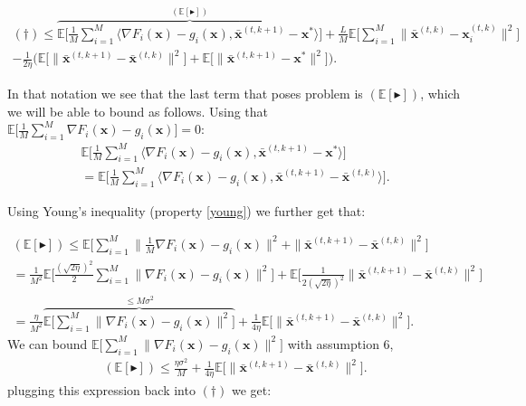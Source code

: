 \begin{align*}
    (\dagger) \leq \overbrace{\mathbb{E} \Bigg[ \frac{1}{M} \sum_{i=1}^M  \langle \nabla F_i(\bm{x}) - g_i(\bm{x})  ,\bar{\bm{x}}^{(t,k+1)} - \bm{x}^{*} \rangle    \Bigg] }^{(\mathbb{E}[\blacktriangleright])}
    + \frac{L}{M}  \mathbb{E} \Bigg[ \sum_{i=1}^M \|\bar{\bm{x}}^{(t,k)}-\bm{x}_i^{(t,k)} \|^2 \Bigg] \\ -  \frac{1}{2\eta} \Bigg( \mathbb{E} \Big[  \|  \bar{\bm{x}}^{(t,k+1)} - \bar{\bm{x}}^{(t,k)} \|^2 \Big] 
    + \mathbb{E} \Big[  \| \bar{\bm{x}}^{(t,k+1)} - \bm{x}^{*} \|^2  \Big] \Bigg).
\end{align*}

In that notation we see that the last term that poses problem is $(\mathbb{E}[\blacktriangleright])$, which we will be able to bound as follows. Using that $\mathbb{E} \big[ \frac{1}{M} \sum_{i=1}^M \nabla F_i(\bm{x}) - g_i(\bm{x}) \big] = 0$:
\begin{align*}
    \mathbb{E} \Bigg[ \frac{1}{M} \sum_{i=1}^M  \langle \nabla F_i(\bm{x}) - g_i(\bm{x})  ,\bar{\bm{x}}^{(t,k+1)} - \bm{x}^{*} \rangle \Bigg] \\
    = \mathbb{E} \Bigg[ \frac{1}{M} \sum_{i=1}^M  \langle \nabla F_i(\bm{x}) - g_i(\bm{x})  ,\bar{\bm{x}}^{(t,k+1)} - \bar{\bm{x}}^{(t,k)} \rangle \Bigg].
\end{align*}

Using Young's inequality (property \ref{young}) we further get that:

\begin{align*}
    (\mathbb{E}[\blacktriangleright]) \leq \mathbb{E} \Bigg[\sum_{i=1}^M  \|  \frac{1}{M} \nabla F_i(\bm{x}) - g_i(\bm{x}) \|^2 + \| \bar{\bm{x}}^{(t,k+1)} - \bar{\bm{x}}^{(t,k)} \|^2 \Bigg] \\
    = \frac{1}{M^2} \mathbb{E} \Bigg[ \frac{(\sqrt{2\eta})^2}{2} \sum_{i=1}^M  \| \nabla F_i(\bm{x}) - g_i(\bm{x}) \|^2 \Bigg] +  \mathbb{E} \Bigg[ \frac{1}{2(\sqrt{2\eta})^2} \| \bar{\bm{x}}^{(t,k+1)} - \bar{\bm{x}}^{(t,k)} \|^2 \Bigg]\\
    = \frac{\eta}{M^2}\overbrace{ \mathbb{E} \Bigg[ \sum_{i=1}^M  \| \nabla F_i(\bm{x}) - g_i(\bm{x}) \|^2 \Bigg]}^{\leq M\sigma^2} +  \frac{1}{4\eta} \mathbb{E} \Bigg[  \| \bar{\bm{x}}^{(t,k+1)} - \bar{\bm{x}}^{(t,k)} \|^2 \Bigg].
\end{align*}
We can bound $\mathbb{E} \big[ \sum_{i=1}^M  \| \nabla F_i(\bm{x}) - g_i(\bm{x}) \|^2 \big]$ with assumption 6,
\begin{align*}
    (\mathbb{E}[\blacktriangleright]) \leq \frac{\eta \sigma^2}{M} +  \frac{1}{4\eta} \mathbb{E} \Bigg[  \| \bar{\bm{x}}^{(t,k+1)} - \bar{\bm{x}}^{(t,k)} \|^2 \Bigg].
\end{align*}
plugging this expression back into $(\dagger)$ we get:


